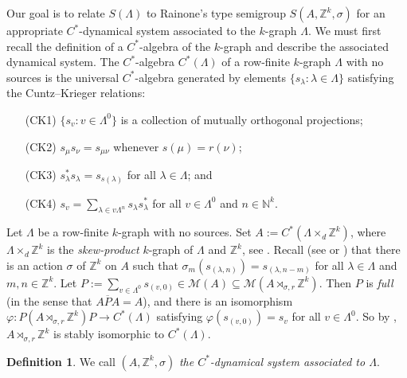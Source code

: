 \documentclass[a4paper, 12pt]{amsart}
\numberwithin{equation}{section}
\newcounter{theorem}
\theoremstyle{remark}
\theoremstyle{definition}
\newtheorem{defn}[theorem]{Definition}
\begin{document}
Our goal is to relate $S(\Lambda)$ to Rainone's type semigroup $S(A,{\mathbb{Z}}^k,\sigma)$ for an
appropriate $C^*$-dynamical system associated to the $k$-graph $\Lambda$. We must first
recall the definition of a $C^*$-algebra of the $k$-graph and describe the associated
dynamical system. The $C^*$-algebra $C^*(\Lambda)$ of a row-finite $k$-graph $\Lambda$
with no sources is the universal $C^*$-algebra generated by elements $\{s_\lambda :
\lambda\in\Lambda \}$ satisfying the Cuntz--Krieger relations:
\begin{itemize}
\item[(CK1)] $\{s_v : v\in \Lambda^0\}$ is a collection of mutually orthogonal
    projections;
\item[(CK2)] $s_\mu s_\nu = s_{\mu\nu}$ whenever $s(\mu) = r(\nu)$;
\item[(CK3)] $s^*_\lambda s_\lambda = s_{s(\lambda)}$ for all $\lambda\in \Lambda$;
    and
\item[(CK4)] $s_v = \sum_{\lambda \in v\Lambda^n} s_\lambda s_\lambda^*$ for all
    $v\in \Lambda^0$ and $n\in {\mathbb{N}}^k$.
\end{itemize}

Let $\Lambda$ be a row-finite $k$-graph with no sources. Set $A:=C^*(\Lambda \times_d
{\mathbb{Z}}^k)$, where $\Lambda \times_d {\mathbb{Z}}^k$ is the \emph{skew-product} $k$-graph of $\Lambda$
and ${\mathbb{Z}}^k$, see \cite[Definition 5.1]{MR1745529}. Recall (see
\cite[Lemma~5.2]{MR3011251} or \cite[Theorem~5.7]{MR1745529}) that there is an action
$\sigma$ of ${\mathbb{Z}}^k$ on $A$ such that $\sigma_m(s_{(\lambda,n)})=s_{(\lambda,n-m)}$ for
all $\lambda \in\Lambda$ and $m, n\in {\mathbb{Z}}^k$. Let $P:=\sum_{v\in \Lambda^0}s_{(v,0)}\in
{\mathcal{M}}(A)\subseteq {\mathcal{M}}(A\rtimes_{\sigma,r}{\mathbb{Z}}^k)$. Then $P$ is \emph{full} (in the sense that $\overline{APA}=A$), and there is an isomorphism $\varphi \colon
P(A\rtimes_{\sigma,r}{\mathbb{Z}}^k)P \to C^*(\Lambda)$ satisfying $\varphi(s_{(v,0)})=s_v$ for
all $v\in \Lambda^0$. So by \cite{MR0463928}, $A\rtimes_{\sigma,r}{\mathbb{Z}}^k$ is stably
isomorphic to $C^*(\Lambda)$.

\begin{defn}\label{defn.dynamical}
We call $(A,{\mathbb{Z}}^k,\sigma)$ \emph{the $C^*$-dynamical system associated to $\Lambda$}.
\end{defn}
\end{document}
